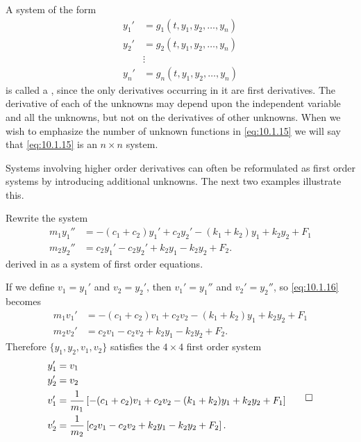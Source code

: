 
A system of the form
\begin{equation} \label{eq:10.1.15}
\begin{aligned}
y_1'&=g_1(t,y_1,y_2,\dots,y_n)\\
y_2'&=g_2(t,y_1,y_2,\dots,y_n)\\
&\vdots\\
y_n'&=g_n(t,y_1,y_2,\dots,y_n)
\end{aligned}
\end{equation}
is called a , since the only derivatives
occurring in it are first derivatives. The derivative of
each of the unknowns may depend upon the independent variable and all
the unknowns, but not on the derivatives of other unknowns. When we
wish to emphasize the number of unknown functions in \eqref{eq:10.1.15} we
will say that \eqref{eq:10.1.15} is an $n\times n$ system.

Systems involving higher order derivatives can often be reformulated
as first order systems by introducing additional unknowns. The next
two examples illustrate this.

\begin{example}\label{example:10.1.4}
Rewrite the system
\begin{equation} \label{eq:10.1.16}
\begin{aligned}
m_1y_1''&=-(c_1+c_2)y_1'+c_2y_2'-(k_1+k_2)y_1+k_2y_2+F_1\\
m_2y_2''&=c_2y_1'-c_2y_2'+k_2y_1-k_2y_2+F_2.
\end{aligned}
\end{equation}
derived in   as a system of first order
equations.
\end{example}

\begin{solution}
If we define $v_1=y_1'$ and $v_2=y_2'$,  then $v_1'=y_1''$ and
$v_2'=y_2''$,  so \eqref{eq:10.1.16} becomes
\begin{align*}
m_1v_1'&=-(c_1+c_2)v_1+c_2v_2-(k_1+k_2)y_1+k_2y_2+F_1\\
m_2v_2'&=c_2v_1-c_2v_2+k_2y_1-k_2y_2+F_2.
\end{align*}
Therefore $\{y_1,y_2,v_1,v_2\}$  satisfies the $4\times4$ first order
system
\begin{equation} \label{eq:10.1.17}
\begin{aligned}
y_1'&=v_1\\
y_2'&=v_2\\
v_1'&=\dfrac{1}{m_1}\left[-(c_1+c_2)v_1+c_2v_2-(k_1+k_2)y_1+k_2y_2+F_1\right]\\
v_2'&=\dfrac{1}{m_2}\left[c_2v_1-c_2v_2+k_2y_1-k_2y_2+F_2\right].
\end{aligned}\qedhere
\end{equation}
\end{solution}

